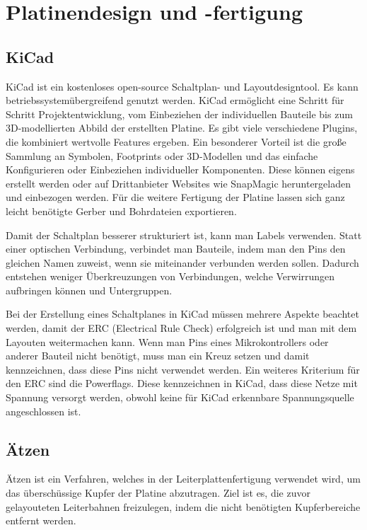\section{Platinendesign und -fertigung} 
\subsection[KiCad]{KiCad\authorkatrin}
KiCad ist ein kostenloses open-source Schaltplan- und Layoutdesigntool.
Es kann betriebssystemübergreifend genutzt werden.
KiCad ermöglicht eine Schritt für Schritt Projektentwicklung, vom Einbeziehen der individuellen Bauteile bis zum 3D-modellierten Abbild der erstellten Platine. 
Es gibt viele verschiedene Plugins, die kombiniert wertvolle Features ergeben. 
Ein besonderer Vorteil ist die große Sammlung an Symbolen, Footprints oder 3D-Modellen und das einfache Konfigurieren oder Einbeziehen individueller Komponenten.
Diese können eigens erstellt werden oder auf Drittanbieter Websites wie SnapMagic heruntergeladen und einbezogen werden.
Für die weitere Fertigung der Platine lassen sich ganz leicht benötigte Gerber und Bohrdateien exportieren. \cite{kicad_docs}
\par\vspace{1em}
\noindent
Damit der Schaltplan besserer strukturiert ist, kann man Labels verwenden.
Statt einer optischen Verbindung, verbindet man Bauteile, indem man den Pins den gleichen Namen zuweist, wenn sie miteinander verbunden werden sollen. 
Dadurch entstehen weniger Überkreuzungen von Verbindungen, welche Verwirrungen aufbringen können und Untergruppen.
\par\vspace{1em}
\noindent
Bei der Erstellung eines Schaltplanes in KiCad müssen mehrere Aspekte beachtet werden, damit der ERC (Electrical Rule Check) erfolgreich ist und man mit dem Layouten weitermachen kann.
Wenn man Pins eines Mikrokontrollers oder anderer Bauteil nicht benötigt, muss man ein Kreuz setzen und damit kennzeichnen, dass diese Pins nicht verwendet werden. Ein weiteres Kriterium für den ERC sind die Powerflags.
Diese kennzeichnen in KiCad, dass diese Netze mit Spannung versorgt werden, obwohl keine für KiCad erkennbare Spannungsquelle angeschlossen ist.

\subsection[Ätzen]{Ätzen\authorlinda}
Ätzen ist ein Verfahren, welches in der Leiterplattenfertigung verwendet wird, um das überschüssige Kupfer der Platine abzutragen. 
Ziel ist es, die zuvor gelayouteten Leiterbahnen freizulegen, indem die nicht benötigten Kupferbereiche entfernt werden. \cite{ablcircuits_pcb_etching}

